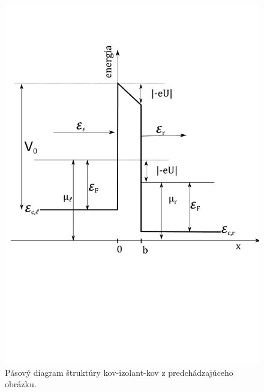 \begin{figure}
        \centering
        \includegraphics[origin=c,scale=0.5]{grafy/barier_v3}
        \caption{Pásový diagram  štruktúry kov-izolant-kov z predchádzajúceho obrázku. }
        \label{fig:barier_v3}
    \end{figure}
